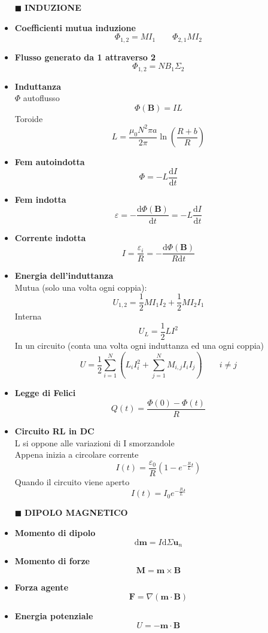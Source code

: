 \documentclass{book}
\newcommand{\g}{\textbf}
\newcommand{\h}{\mathbf}
\newcommand{\e}{\begin{equation}}
\newcommand{\ex}{\end{equation} }
\renewcommand{\it}{\item[$\cdot$]}
\begin{document}
\begin{multicols}{4}
\begin{itemize}
\item [$\blacksquare$] \g{INDUZIONE}
    \it \g{Coefficienti mutua induzione}
        \e{\Phi_{1,2}=MI_1 \qquad \Phi_{2,1}MI_2} \ex
    \it \g{Flusso generato da 1 attraverso 2} 
        \e{\Phi_{1,2}=NB_1\Sigma_2} \ex
    \it \g{Induttanza}\\
        $\Phi$ autoflusso
        \e{\Phi(\h{B})=IL} \ex
        Toroide 
        \e{L = \frac{\mu_0 N^2 \pi a}{2\pi} \ln\left(\frac{R+b}{R}\right)}\ex
    \it \g{Fem autoindotta}
        \e{\Phi=-L\frac{\mathrm{d}I}{\mathrm{d}t}} \ex
    \it \g{Fem indotta}
        \e{\varepsilon=-\frac{\mathrm{d}\Phi(\h{B})}{\mathrm{d}t}}=-L\frac{\mathrm{d}I}{\mathrm{d}t} \ex
    \it \g{Corrente indotta}
        \e{I=\frac{\varepsilon_i}{R}=-\frac{\mathrm{d}\Phi(\h{B})}{R\mathrm{d}t}} \ex
    \it \g{Energia dell'induttanza} \\
        Mutua (solo una volta ogni coppia):
        \e{U_{1,2}=\frac{1}{2}MI_1I_2+\frac{1}{2}MI_2I_1}\ex
        Interna
        \e{U_L=\frac{1}{2}LI^2} \ex
        In un circuito (conta una volta ogni induttanza ed una ogni coppia)
        \e{U=\frac{1}{2}\sum_{i=1}^N(L_iI_i^2+\sum_{j=1}^N M_{i,j}I_iI_j) \qquad i\neq j} \ex
    \it \g{Legge di Felici}
        \e{Q(t)=\frac{\Phi(0)-\Phi(t)}{R}} \ex
    \it \g{Circuito RL in DC}\\
        L si oppone alle variazioni di I smorzandole \\
        Appena inizia a circolare corrente \\
        \e{I(t)=\frac{\varepsilon_0}{R}(1-e^{-\frac{R}{L}t})} \ex
        Quando il circuito viene aperto \\
        \e{I(t)=I_0 e^{-\frac{R}{L}t}} \ex

\item [$\blacksquare$] \g{DIPOLO MAGNETICO}
    \it \g{Momento di dipolo}
        \e{\mathrm{d}\h{m}=I\mathrm{d}\Sigma\h{u}_n} \ex
    \it \g{Momento di forze}
        \e{\h{M}=\h{m}\times\h{B}} \ex
    \it \g{Forza agente}
        \e{\h{F}=\nabla(\h{m}\cdot\h{B})} \ex
    \it \g{Energia potenziale}
        \e{U=-\h{m}\cdot\h{B}} \ex
        

\end{itemize}
\end{multicols}
\end{document}
